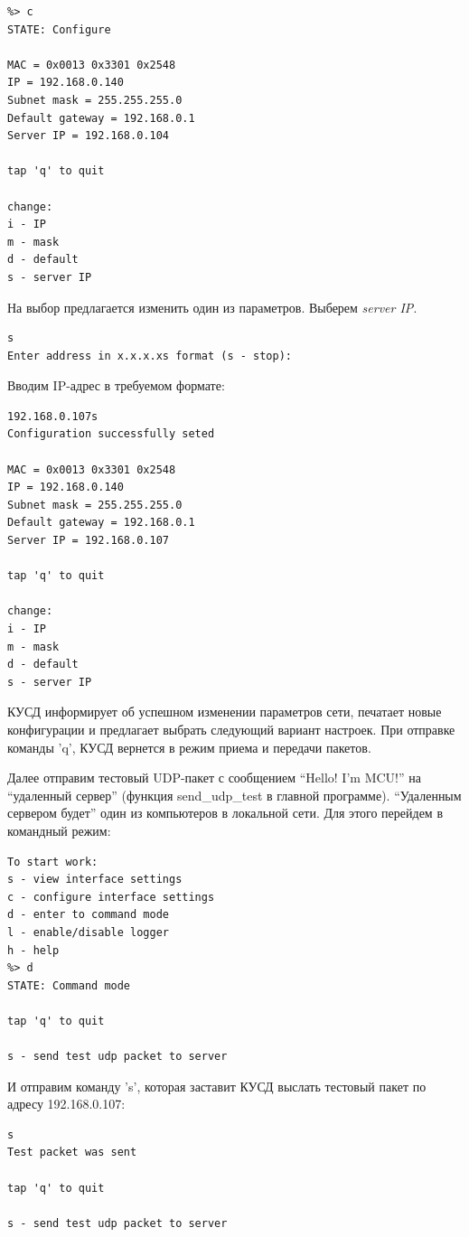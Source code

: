 \begin{verbatim}
%> c
STATE: Configure

MAC = 0x0013 0x3301 0x2548 
IP = 192.168.0.140
Subnet mask = 255.255.255.0
Default gateway = 192.168.0.1
Server IP = 192.168.0.104

tap 'q' to quit

change:
i - IP
m - mask
d - default
s - server IP
\end{verbatim}

На выбор предлагается изменить один из параметров. Выберем \textit{server IP}.

\begin{verbatim}
s
Enter address in x.x.x.xs format (s - stop):
\end{verbatim}

Вводим IP-адрес в требуемом формате:

\begin{verbatim}
192.168.0.107s
Configuration successfully seted

MAC = 0x0013 0x3301 0x2548 
IP = 192.168.0.140
Subnet mask = 255.255.255.0
Default gateway = 192.168.0.1
Server IP = 192.168.0.107

tap 'q' to quit

change:
i - IP
m - mask
d - default
s - server IP
\end{verbatim}

КУСД информирует об успешном изменении параметров сети, печатает новые конфигурации и предлагает выбрать следующий вариант настроек. При отправке команды 'q', КУСД вернется в режим приема и передачи пакетов.

Далее отправим тестовый UDP-пакет с сообщением ``Hello! I'm MCU!'' на ``удаленный сервер'' (функция send\_udp\_test в главной программе). ``Удаленным сервером будет'' один из компьютеров в локальной сети. Для этого перейдем в командный режим:

\begin{verbatim}
To start work:
s - view interface settings
c - configure interface settings
d - enter to command mode
l - enable/disable logger
h - help
%> d
STATE: Command mode

tap 'q' to quit

s - send test udp packet to server
\end{verbatim}

И отправим команду 's', которая заставит КУСД выслать тестовый пакет по адресу 192.168.0.107:

\begin{verbatim}
s
Test packet was sent

tap 'q' to quit

s - send test udp packet to server
\end{verbatim}


